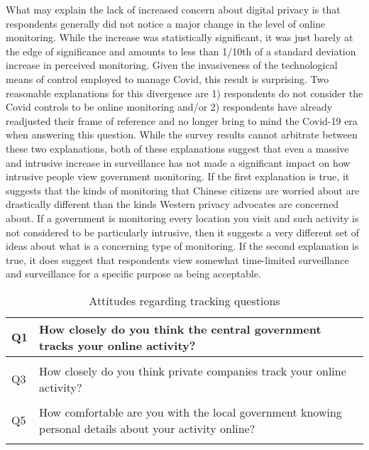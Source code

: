 \documentclass[
  letterpaper,
  DIV=11,
  numbers=noendperiod]{scrartcl}
\begin{document}
What may explain the lack of increased concern about digital privacy is
that respondents generally did not notice a major change in the level of
online monitoring. While the increase was statistically significant, it
was just barely at the edge of significance and amounts to less than
1/10th of a standard deviation increase in perceived monitoring. Given
the invasiveness of the technological means of control employed to
manage Covid, this result is surprising. Two reasonable explanations for
this divergence are 1) respondents do not consider the Covid controls to
be online monitoring and/or 2) respondents have already readjusted their
frame of reference and no longer bring to mind the Covid-19 era when
answering this question. While the survey results cannot arbitrate
between these two explanations, both of these explanations suggest that
even a massive and intrusive increase in surveillance has not made a
significant impact on how intrusive people view government monitoring.
If the first explanation is true, it suggests that the kinds of
monitoring that Chinese citizens are worried about are drastically
different than the kinds Western privacy advocates are concerned about.
If a government is monitoring every location you visit and such activity
is not considered to be particularly intrusive, then it suggests a very
different set of ideas about what is a concerning type of monitoring. If
the second explanation is true, it does suggest that respondents view
somewhat time-limited surveillance and surveillance for a specific
purpose as being acceptable.

\hypertarget{tbl-track.q.text}{}
\begin{table}
\caption{\label{tbl-track.q.text}Attitudes regarding tracking questions }\tabularnewline

\centering
\begin{tabular}[t]{l|>{\raggedright\arraybackslash}p{5in}}
\hline
Q1 & How closely do you think the central government tracks your online activity?\\
\hline
\cellcolor{gray!6}{Q2} & \cellcolor{gray!6}{How closely do you think the local government tracks your online activity?}\\
\hline
Q3 & How closely do you think private companies track your online activity?\\
\hline
\cellcolor{gray!6}{Q4} & \cellcolor{gray!6}{How comfortable are you with the central government knowing personal details about your activity online?}\\
\hline
Q5 & How comfortable are you with the local government knowing personal details about your activity online?\\
\hline
\cellcolor{gray!6}{Q6} & \cellcolor{gray!6}{How comfortable are you with private companies knowing personal details about your activity online?}\\
\hline
\end{tabular}
\end{table}
\end{document}
